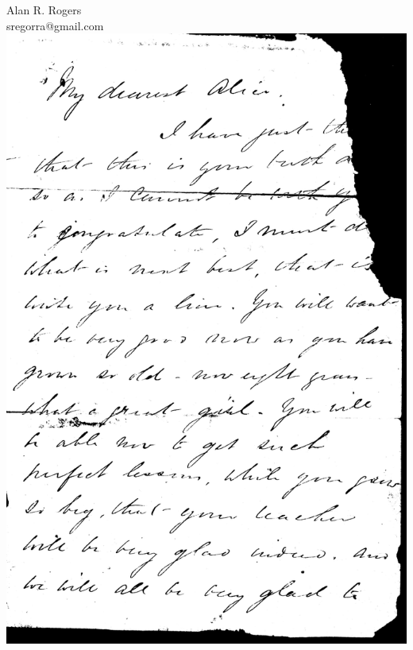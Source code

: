 \documentclass[12pt]{article}
\begin{document}
\bigskip

\mbox{}\hfill Alan R. Rogers\\
\mbox{}\hfill sregorra@gmail.com\\

\includegraphics[width=\textwidth]{RobtCarley1.pdf}
\end{document}
